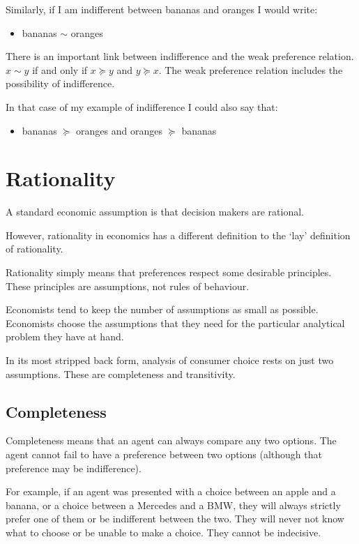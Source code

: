 \documentclass[
  letterpaper,
  DIV=11,
  numbers=noendperiod]{scrreprt}
\providecommand{\tightlist}{%
  \setlength{\itemsep}{0pt}\setlength{\parskip}{0pt}}\usepackage{longtable,booktabs,array}
\begin{document}
Similarly, if I am indifferent between bananas and oranges I would
write:

\begin{itemize}
\tightlist
\item
  bananas \(\sim\) oranges
\end{itemize}

There is an important link between indifference and the weak preference
relation. \(x \sim y\) if and only if \(x \succcurlyeq y\) and
\(y \succcurlyeq x\). The weak preference relation includes the
possibility of indifference.

In that case of my example of indifference I could also say that:

\begin{itemize}
\tightlist
\item
  bananas \(\succcurlyeq\) oranges and oranges \(\succcurlyeq\) bananas
\end{itemize}

\hypertarget{rationality}{%
\chapter{Rationality}\label{rationality}}

A standard economic assumption is that decision makers are rational.

However, rationality in economics has a different definition to the
`lay' definition of rationality.

Rationality simply means that preferences respect some desirable
principles. These principles are assumptions, not rules of behaviour.

Economists tend to keep the number of assumptions as small as possible.
Economists choose the assumptions that they need for the particular
analytical problem they have at hand.

In its most stripped back form, analysis of consumer choice rests on
just two assumptions. These are completeness and transitivity.

\hypertarget{completeness}{%
\section{Completeness}\label{completeness}}

Completeness means that an agent can always compare any two options. The
agent cannot fail to have a preference between two options (although
that preference may be indifference).

For example, if an agent was presented with a choice between an apple
and a banana, or a choice between a Mercedes and a BMW, they will always
strictly prefer one of them or be indifferent between the two. They will
never not know what to choose or be unable to make a choice. They cannot
be indecisive.
\end{document}
